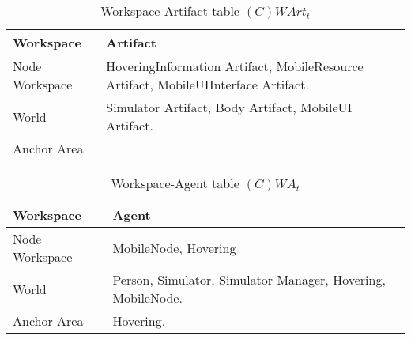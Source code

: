 \begin{table}[H]
	\centering
	\begin{tabular}{|p{4cm}|p{8cm}|}
			\hline
			\textbf{Workspace} & \textbf{Artifact} \\
			\hline
			Node Workspace & HoveringInformation Artifact,
			MobileResource Artifact, MobileUIInterface Artifact. \\
			\hline
      World & Simulator Artifact, Body Artifact, MobileUI Artifact. \\
			\hline
			Anchor Area & \\
			\hline
		\end{tabular}
	\caption{Workspace-Artifact table $(C)WArt_t$}
	\label{tab:cwartt}
\end{table}

\begin{table}[H]
	\centering
	\begin{tabular}{|p{4cm}|p{8cm}|}
			\hline
			\textbf{Workspace} & \textbf{Agent} \\
			\hline
			Node Workspace & MobileNode, Hovering \\
			\hline
      World & Person, Simulator, Simulator Manager, Hovering, MobileNode. \\
			\hline
			Anchor Area & Hovering. \\
			\hline
		\end{tabular}
	\caption{Workspace-Agent table $(C)WA_t$}
	\label{tab:cwat}
\end{table}
